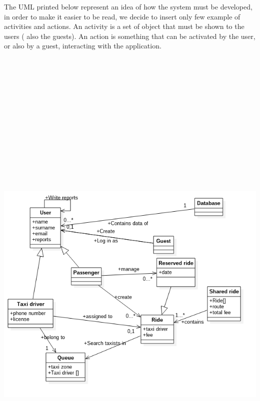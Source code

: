 The UML printed below represent an idea of how the system must be developed, in order to make it easier to be read,
we decide to insert only few example of activities and actions.
An activity is a set of object that must be shown to the users ( also the guests).
An action is something that can be activated by the user, or also by a guest, interacting with the application.
\begin{center}
\hspace*{-2cm}
 \includegraphics[height=25cm, width=18cm]{UML/RASDUML.png}
\end{center}
